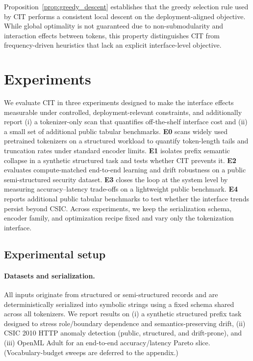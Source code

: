 Proposition~\ref{prop:greedy_descent} establishes that the greedy selection rule used by CIT performs a
consistent local descent on the deployment-aligned objective.
While global optimality is not guaranteed due to non-submodularity and interaction effects between tokens,
this property distinguishes CIT from frequency-driven heuristics that lack an explicit interface-level
objective.

\section{Experiments}
\label{sec:experiments}

We evaluate CIT in three experiments designed to make the interface effects measurable under controlled, deployment-relevant constraints, and additionally report (i) a tokenizer-only scan that quantifies off-the-shelf interface cost and (ii) a small set of additional public tabular benchmarks.
\textbf{E0} scans widely used pretrained tokenizers on a structured workload to quantify token-length tails and truncation rates under standard encoder limits.
\textbf{E1} isolates prefix semantic collapse in a synthetic structured task and tests whether CIT prevents it.
\textbf{E2} evaluates compute-matched end-to-end learning and drift robustness on a public semi-structured security dataset.
\textbf{E3} closes the loop at the system level by measuring accuracy--latency trade-offs on a lightweight public benchmark.
\textbf{E4} reports additional public tabular benchmarks to test whether the interface trends persist beyond CSIC.
Across experiments, we keep the serialization schema, encoder family, and optimization recipe fixed and vary only the tokenization interface.

\subsection{Experimental setup}
\label{sec:exp_protocol}

\paragraph{Datasets and serialization.}
All inputs originate from structured or semi-structured records and are deterministically
serialized into symbolic strings using a fixed schema shared across all tokenizers.
We report results on (i) a synthetic structured prefix task designed to stress role/boundary dependence and semantics-preserving drift,
(ii) CSIC 2010 HTTP anomaly detection (public, structured, and drift-prone),
and (iii) OpenML Adult for an end-to-end accuracy/latency Pareto slice.
(Vocabulary-budget sweeps are deferred to the appendix.)

